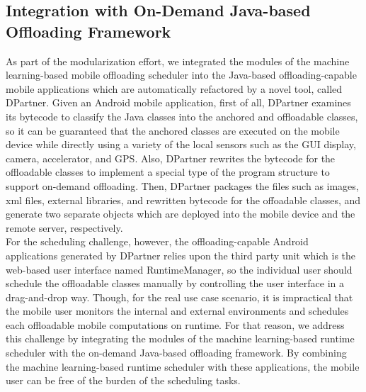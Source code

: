 \documentclass[10pt, conference, compsocconf]{IEEEtran}
\begin{document}
{\subsection{Integration with On-Demand Java-based Offloading Framework}
%
As part of the modularization effort, we integrated the modules of the
machine learning-based mobile offloading scheduler into the Java-based
offloading-capable mobile applications which are automatically
refactored by a novel tool, called DPartner.
%
Given an Android mobile application, first of all, DPartner examines its
bytecode to classify the Java classes into the anchored and offloadable
classes, so it can be guaranteed that the anchored classes are executed
on the mobile device while directly using a variety of the local sensors
such as the GUI display, camera, accelerator, and GPS.
%
Also, DPartner rewrites the bytecode for the offloadable classes to
implement a special type of the program structure to support on-demand
offloading.
%
Then, DPartner packages the files such as images, xml files, external
libraries, and rewritten bytecode for the offoadable classes, and
generate two separate objects which are deployed into the mobile device
and the remote server, respectively.\\
%
\indent For the scheduling challenge, however, the offloading-capable
Android applications generated by DPartner relies upon the third party
unit which is the web-based user interface named RuntimeManager, so the
individual user should schedule the offloadable classes manually by
controlling the user interface in a drag-and-drop way. 
%
Though, for the real use case scenario, it is impractical that the
mobile user monitors the internal and external environments and
schedules each offloadable mobile computations on runtime.
%
For that reason, we address this challenge by integrating the modules of
the machine learning-based runtime scheduler with the on-demand
Java-based offloading framework.  
%
By combining the machine learning-based runtime scheduler with these
applications, the mobile user can be free of the burden of the scheduling
tasks.
%
}
\end{document}

